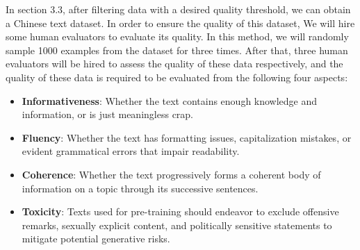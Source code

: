 \documentclass{article}
\begin{document}
In section 3.3, after filtering data with a desired quality threshold, we can obtain a Chinese text dataset. In order to ensure the quality of this dataset, We will hire some human evaluators to evaluate its quality. In this method, we will randomly sample 1000 examples from the dataset for three times. After that, three human evaluators will be hired to assess the quality of these data respectively, and the quality of these data is required to be evaluated from the following four aspects: 


\begin{itemize}
\item \textbf{Informativeness}: Whether the text contains enough knowledge and information,  or is just meaningless crap.
\item \textbf{Fluency}: Whether the text has formatting issues, capitalization mistakes, or evident grammatical errors that impair readability.
\item \textbf{Coherence}: Whether the text progressively forms a coherent body of information on a topic through its successive sentences. 
\item \textbf{Toxicity}: Texts used for pre-training should endeavor to exclude offensive remarks, sexually explicit content, and politically sensitive statements to mitigate potential generative risks.
 \end{itemize}
 
\end{document}
